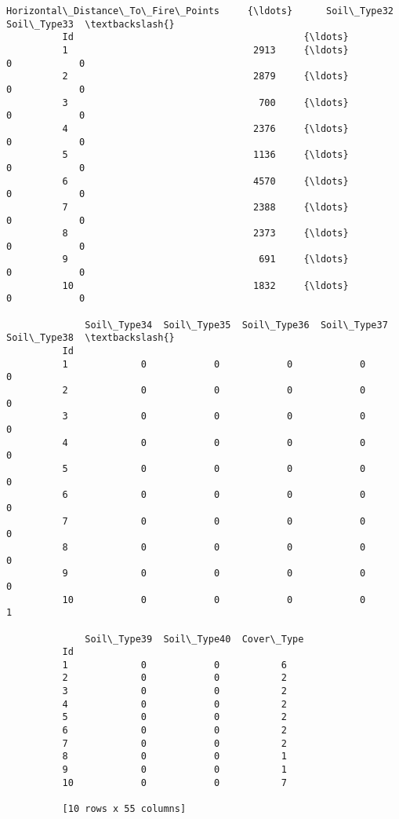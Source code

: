 \documentclass[11pt]{article}
\begin{document}
\begin{Verbatim}[commandchars=\\\{\}]
              Horizontal\_Distance\_To\_Fire\_Points     {\ldots}      Soil\_Type32  Soil\_Type33  \textbackslash{}
          Id                                         {\ldots}                                 
          1                                 2913     {\ldots}                0            0   
          2                                 2879     {\ldots}                0            0   
          3                                  700     {\ldots}                0            0   
          4                                 2376     {\ldots}                0            0   
          5                                 1136     {\ldots}                0            0   
          6                                 4570     {\ldots}                0            0   
          7                                 2388     {\ldots}                0            0   
          8                                 2373     {\ldots}                0            0   
          9                                  691     {\ldots}                0            0   
          10                                1832     {\ldots}                0            0   
          
              Soil\_Type34  Soil\_Type35  Soil\_Type36  Soil\_Type37  Soil\_Type38  \textbackslash{}
          Id                                                                    
          1             0            0            0            0            0   
          2             0            0            0            0            0   
          3             0            0            0            0            0   
          4             0            0            0            0            0   
          5             0            0            0            0            0   
          6             0            0            0            0            0   
          7             0            0            0            0            0   
          8             0            0            0            0            0   
          9             0            0            0            0            0   
          10            0            0            0            0            1   
          
              Soil\_Type39  Soil\_Type40  Cover\_Type  
          Id                                        
          1             0            0           6  
          2             0            0           2  
          3             0            0           2  
          4             0            0           2  
          5             0            0           2  
          6             0            0           2  
          7             0            0           2  
          8             0            0           1  
          9             0            0           1  
          10            0            0           7  
          
          [10 rows x 55 columns]
\end{Verbatim}
            
\end{document}

